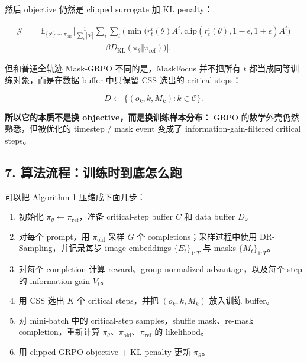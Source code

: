 然后 objective 仍然是 clipped surrogate 加 KL penalty：

\[
\begin{aligned}
\mathcal{J}
&=
\mathbb{E}_{\{o^i\}\sim\pi_{\mathrm{old}}}
\Bigg[
\frac{1}{\sum_i |o^i|}
\sum_i\sum_t
\Bigg(
\min\Big(
 r_t^i(\theta)A^i,
\mathrm{clip}(r_t^i(\theta),1-\epsilon,1+\epsilon)A^i
\Big)\\
&\qquad\qquad\qquad\qquad
-
\beta D_{\mathrm{KL}}(\pi_\theta\Vert\pi_{\mathrm{ref}})
\Bigg)
\Bigg].
\end{aligned}
\]

但和普通全轨迹 Mask-GRPO 不同的是，MaskFocus 并不把所有 \(t\) 都当成同等训练对象，而是在数据 buffer 中只保留 CSS 选出的 critical steps：

\[
D
\leftarrow
\{(o_k,k,M_k): k\in\mathcal{C}\}.
\]

\begin{summarybox}
\textbf{所以它的本质不是换 objective，而是换训练样本分布：} GRPO 的数学外壳仍然熟悉，但被优化的 timestep / mask event 变成了 information-gain-filtered critical steps。
\end{summarybox}

\subsection{7. 算法流程：训练时到底怎么跑}

可以把 Algorithm 1 压缩成下面几步：

\begin{enumerate}[leftmargin=1.5em]
  \item 初始化 \(\pi_\theta\leftarrow\pi_{\mathrm{ref}}\)，准备 critical-step buffer \(C\) 和 data buffer \(D\)。
  \item 对每个 prompt，用 \(\pi_{\mathrm{old}}\) 采样 \(G\) 个 completions；采样过程中使用 DR-Sampling，并记录每步 image embeddings \(\{E_t\}_{1:T}\) 与 masks \(\{M_t\}_{1:T}\)。
  \item 对每个 completion 计算 reward、group-normalized advantage，以及每个 step 的 information gain \(V_t\)。
  \item 用 CSS 选出 \(K\) 个 critical steps，并把 \((o_k,k,M_k)\) 放入训练 buffer。
  \item 对 mini-batch 中的 critical-step samples，shuffle mask、re-mask completion，重新计算 \(\pi_\theta\)、\(\pi_{\mathrm{old}}\)、\(\pi_{\mathrm{ref}}\) 的 likelihood。
  \item 用 clipped GRPO objective + KL penalty 更新 \(\pi_\theta\)。
\end{enumerate}

